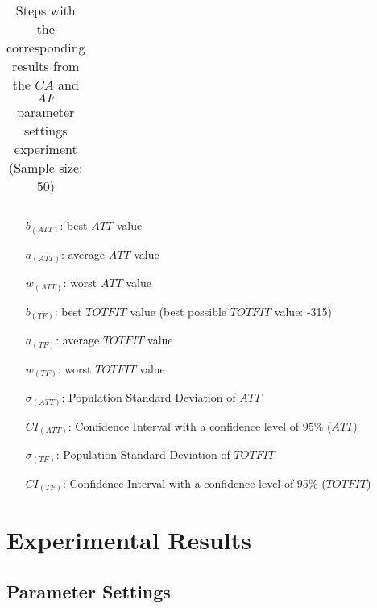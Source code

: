 \begin{sidewaystable}
\begin{tabular}{|l|l|l||c|c|c|c|c|c|c|c|c|c|}
    \hline
    \end{tabular}
    \caption {Steps with the corresponding results from the $CA$ and $AF$ parameter settings experiment (Sample size: 50)}
    \tiny
    \begin{itemize}[noitemsep]
    \item[$b_{(ATT)}$:] best $ATT$ value
    \item[$a_{(ATT)}$:] average $ATT$ value
    \item[$w_{(ATT)}$:] worst $ATT$ value
    \item[$b_{(TF)}$:] best $TOTFIT$ value (best possible $TOTFIT$ value: -315)
    \item[$a_{(TF)}$:] average $TOTFIT$ value
    \item[$w_{(TF)}$:] worst $TOTFIT$ value
    \item[$\sigma_{(ATT)}$:] Population Standard Deviation of $ATT$
    \item[$CI_{(ATT)}$:] Confidence Interval with a confidence level of 95\% ($ATT$)
    \item[$\sigma_{(TF)}$:] Population Standard Deviation of $TOTFIT$
    \item[$CI_{(TF)}$:] Confidence Interval with a confidence level of 95\% ($TOTFIT$)
    \end{itemize}
    \label{table:pm2}
\end{sidewaystable}



\chapter{Experimental Results}
\label{appendixC}

\section{Parameter Settings}

